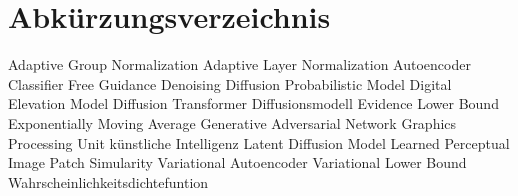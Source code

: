 \chapter*{Abkürzungsverzeichnis}

\begin{acronym}[AdaGN]
        {Adaptive Group Normalization}
        {Adaptive Layer Normalization}
           {Autoencoder}
          {Classifier Free Guidance}
         {Denoising Diffusion Probabilistic Model}
          {Digital Elevation Model}
          {Diffusion Transformer}
           {Diffusionsmodell}
         {Evidence Lower Bound}
          {Exponentially Moving Average}
          {Generative Adversarial Network}
          {Graphics Processing Unit}
           {künstliche Intelligenz}
          {Latent Diffusion Model}
        {Learned Perceptual Image Patch Simularity}
          {Variational Autoencoder}
          {Variational Lower Bound}
          {Wahrscheinlichkeitsdichtefuntion}
\end{acronym}